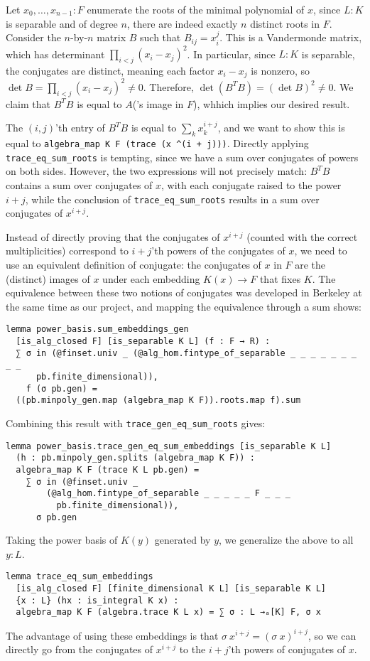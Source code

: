 \documentclass{lipics-v2021}
\newcommand{\lean}[1]{\texttt{#1}\xspace} %
\newcommand{\pow}{\textasciicircum\xspace}
\begin{document}
Let $x_0, \dots, x_{n - 1} : F$ enumerate the roots of the minimal polynomial of $x$,
since $L : K$ is separable and of degree $n$, there are indeed exactly $n$ distinct roots in $F$.
Consider the $n$-by-$n$ matrix $B$ such that $B_{ij} = x_i^j$.
This is a Vandermonde matrix, which has determinant $\prod_{i < j} (x_i - x_j)^2$.
In particular, since $L : K$ is separable, the conjugates are distinct, meaning each factor $x_i - x_j$ is nonzero,
so $\det B = \prod_{i < j} (x_i - x_j)^2 \ne 0$.
Therefore, $\det (B^T B) = (\det B)^2 \ne 0$.
We claim that $B^T B$ is equal to $A$('s image in $F$), whhich implies our desired result.

The $(i, j)$'th entry of $B^T B$ is equal to $\sum_k x_k^{i + j}$,
and we want to show this is equal to \lean{algebra\_map K F (trace (x \pow (i + j)))}.
Directly applying \lean{trace\_eq\_sum\_roots} is tempting, since we have a sum over conjugates of powers on both sides.
However, the two expressions will not precisely match: $B^T B$ contains a sum over conjugates of $x$, with each conjugate raised to the power $i + j$,
while the conclusion of \lean{trace\_eq\_sum\_roots} results in a sum over conjugates of $x^{i + j}$.

Instead of directly proving that the conjugates of $x^{i + j}$ (counted with the correct multiplicities) correspond to $i + j$'th powers of the conjugates of $x$,
we need to use an equivalent definition of conjugate:
the conjugates of $x$ in $F$ are the (distinct) images of $x$ under each embedding $K(x) \to F$ that fixes $K$.
The equivalence between these two notions of conjugates was developed in Berkeley at the same time as our project, and mapping the equivalence through a sum shows: %
\begin{lstlisting}
lemma power_basis.sum_embeddings_gen
  [is_alg_closed F] [is_separable K L] (f : F → R) :
  ∑ σ in (@finset.univ _ (@alg_hom.fintype_of_separable _ _ _ _ _ _ _ _ _
      pb.finite_dimensional)),
    f (σ pb.gen) =
  ((pb.minpoly_gen.map (algebra_map K F)).roots.map f).sum
\end{lstlisting}
Combining this result with \lean{trace\_gen\_eq\_sum\_roots} gives:
\begin{lstlisting}
lemma power_basis.trace_gen_eq_sum_embeddings [is_separable K L]
  (h : pb.minpoly_gen.splits (algebra_map K F)) :
  algebra_map K F (trace K L pb.gen) =
    ∑ σ in (@finset.univ _
        (@alg_hom.fintype_of_separable _ _ _ _ _ F _ _ _
          pb.finite_dimensional)),
      σ pb.gen
\end{lstlisting}
Taking the power basis of $K(y)$ generated by $y$, we generalize the above to all $y : L$.
\begin{lstlisting}
lemma trace_eq_sum_embeddings
  [is_alg_closed F] [finite_dimensional K L] [is_separable K L]
  {x : L} (hx : is_integral K x) :
  algebra_map K F (algebra.trace K L x) = ∑ σ : L →ₐ[K] F, σ x
\end{lstlisting}
The advantage of using these embeddings is that $\sigma\ x^{i + j} = (\sigma\ x)^{i + j}$,
so we can directly go from the conjugates of $x^{i + j}$ to the $i + j$'th powers of conjugates of $x$.
\end{document}
